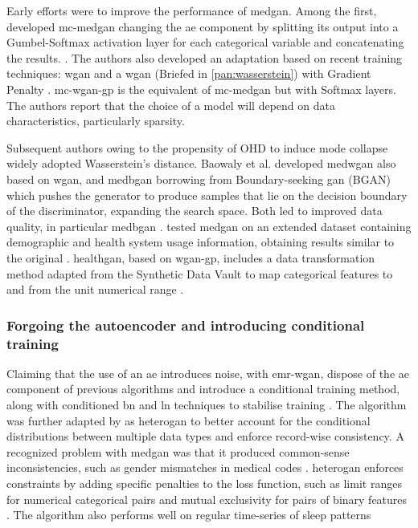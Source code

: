            Early efforts were to improve the performance of \gls{medgan}. Among the first, \citeauthor{Camino2018-re} developed \gls{mc-medgan} changing the \gls{ae} component by splitting its output into a Gumbel-Softmax \cite{jang2016categorical} activation layer for each categorical variable and concatenating the results. \cite{Camino2018-re}. The authors also developed an adaptation based on recent training techniques: \gls{wgan} \cite{arjovsky2017wasserstein} and a \gls{wgan} (Briefed in \autoref{pan:wasserstein}) with Gradient Penalty \cite{gulrajani2017improved}. \gls{mc-wgan-gp} is the equivalent of \gls{mc-medgan} but with Softmax layers. The authors report that the choice of a model will depend on data characteristics, particularly sparsity.\par
            
            
            Subsequent authors owing to the propensity of OHD to induce mode collapse widely adopted Wasserstein’s distance. Baowaly et al. developed \gls{medwgan} also based on \gls{wgan}, and \gls{medbgan} borrowing from Boundary-seeking \gls{gan} (BGAN) \cite{hjelm2017boundaryseeking} which pushes the generator to produce samples that lie on the decision boundary of the discriminator, expanding the search space. Both led to improved data quality, in particular \gls{medbgan} \cite{baowaly_2019_IEEE,baowaly_2019_jamia}. \citeauthor{Jackson_2019} tested \gls{medgan} on an extended dataset containing demographic and health system usage information, obtaining results similar to the original \cite{Jackson_2019}. \gls{healthgan}, based on \gls{wgan-gp}, includes a data transformation method adapted from the Synthetic Data Vault \cite{Patki_2016} to map categorical features to and from the unit numerical range \cite{Yale_2020}. 
        
        \subsubsection{Forgoing the autoencoder and introducing conditional training}\label{noauto}

            Claiming that the use of an \gls{ae} introduces noise, with \gls{emr-wgan}, \citeauthor{Zhang2020} dispose of the \gls{ae} component of previous algorithms and introduce a conditional training method, along with conditioned \gls{bn} and \gls{ln} techniques to stabilise training \cite{Zhang2020}. The algorithm was further adapted by \citeauthor{yan2020generating} as \gls{heterogan} to better account for the conditional distributions between multiple data types and enforce record-wise consistency. A recognized problem with \gls{medgan} was that it produced common-sense inconsistencies, such as gender mismatches in medical codes \cite{yan2020generating, Choi2017-nt}. \gls{heterogan} enforces constraints by adding specific penalties to the loss function, such as limit ranges for numerical categorical pairs and mutual exclusivity for pairs of binary features \cite{yan2020generating}. The algorithm also performs well on regular time-series of sleep patterns \cite{dash2019synthetic} \par


